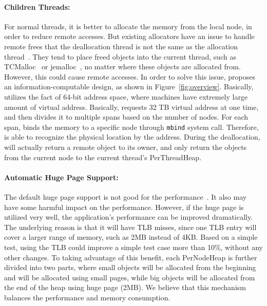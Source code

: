 \paragraph{Children Threads:} For normal threads, it is better to allocate the memory from the local node, in order to reduce remote accesses. But existing allocators have an issue to handle remote frees that the deallocation thread is not the same as the allocation thread~\cite{Aigner:2015:FML:2814270.2814294}. They tend to place freed objects into the current thread, such as TCMalloc~\cite{tcmalloc} or jemalloc~\cite{jemalloc}, no matter where these objects are allocated from.  However, this could cause remote accesses.  
In order to solve this issue, \NM{} proposes an information-computable design, as shown in Figure~\ref{fig:overview}. Basically, \NM{} utilizes the fact of 64-bit address space, where machines have extremely large amount of virtual address. Basically, \NM{} requests 32 TB virtual address at one time, and then divides it to multiple spans based on the number of nodes. For each span, \NM{} binds the memory to a specific node through \texttt{mbind} system call. Therefore, \NM{} is able to recognize the physical location by the address. During the deallocation, \NM{} will actually return a remote object to its owner, and only return the objects from the current node to the current thread's PerThreadHeap. 


\paragraph{Automatic Huge Page Support:} The default huge page support is not good for the performance~\cite{}. It also may have some harmful impact on the performance. However, if the huge page is utilized very well, the application's performance can be improved dramatically. The underlying reason is that it will have TLB misses, since one TLB entry will cover a larger range of memory, such as 2MB instead of 4KB. Based on a simple test, using the TLB could improve a simple test case more than 10\%, without any other changes. To taking advantage of this benefit, each PerNodeHeap is further divided into two parts, where small objects will be allocated from the beginning and will be allocated using small pages, while big objects will be allocated from the end of the heap using huge page (2MB). We believe that this mechanism balances the performance and memory consumption.   

